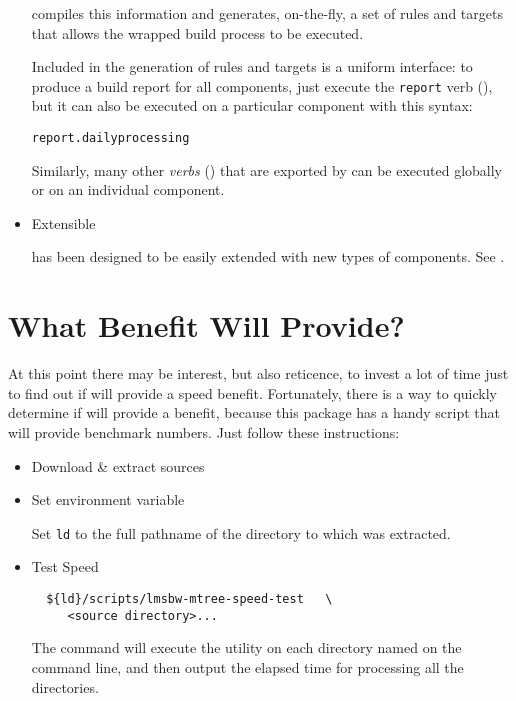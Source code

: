 \begin{itemize}
  \lmsbw compiles this information and generates, on-the-fly, a set of
  \make rules and targets that allows the wrapped build process to be
  executed.

  Included in the generation of rules and targets is a uniform
  interface: to produce a build report for all components, just
  execute the \texttt{report} verb (), but it
  can also be executed on a particular component with this syntax:

  \begin{center}
    \texttt{report.dailyprocessing}
  \end{center}

  Similarly, many other \emph{verbs} ()
  that are exported by \lmsbw can be executed globally or on an
  individual component.

\item Extensible

  \lmsbw has been designed to be easily extended with new types of
  components.  See .
\end{itemize}

\section{What Benefit Will \lmsbw Provide?}

At this point there may be interest, but also reticence, to invest a
lot of time just to find out if \lmsbw will provide a speed benefit.
Fortunately, there is a way to quickly determine if \lmsbw will
provide a benefit, because this package has a handy script that will
provide benchmark numbers.  Just follow these instructions:

\begin{itemize}
\item Download \& extract \lmsbw sources

\item Set environment variable

  Set \texttt{ld} to the full pathname of the directory to which
  \lmsbw was extracted.

\item Test Speed

\begin{verbatim}
  ${ld}/scripts/lmsbw-mtree-speed-test   \
     <source directory>...
\end{verbatim}

  The command will execute the \mtree utility on each directory named
  on the command line, and then output the elapsed time for processing
  all the directories.

\end{itemize}

